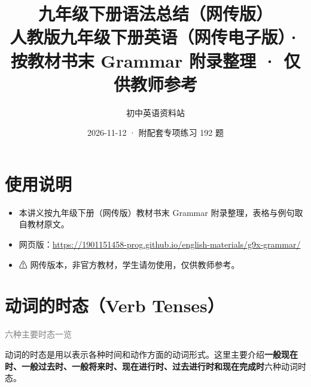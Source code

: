 \documentclass[11pt,a4paper]{ctexart}
\title{\textbf{九年级下册语法总结（网传版）}\\[4pt]
\large 人教版九年级下册英语（网传电子版）· 按教材书末 Grammar 附录整理 · 仅供教师参考}
\author{初中英语资料站}
\date{2026-11-12 · 附配套专项练习 192 题}
\begin{document}
\maketitle
\begin{center}
\end{center}
\bigskip

\section*{使用说明}
\begin{itemize}[leftmargin=1.4em]
\item 本讲义按九年级下册（网传版）教材书末 Grammar 附录整理，表格与例句取自教材原文。
\item 网页版：\url{https://1901151458-prog.github.io/english-materials/g9x-grammar/}
\item ⚠ 网传版本，非官方教材，学生请勿使用，仅供教师参考。
\end{itemize}

\section{动词的时态（Verb Tenses）}
\noindent\textcolor{gray}{六种主要时态一览}\par\smallskip
动词的时态是用以表示各种时间和动作方面的动词形式。这里主要介绍\textbf{一般现在时、一般过去时、一般将来时、现在进行时、过去进行时和现在完成时}六种动词时态。
\end{document}
